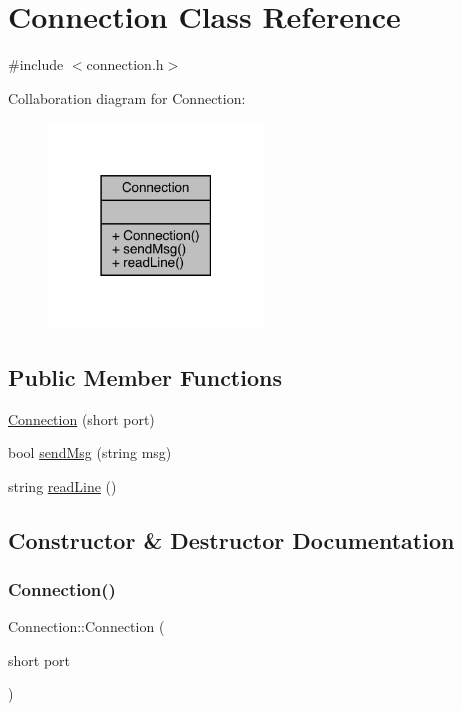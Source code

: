 \hypertarget{class_connection}{}\section{Connection Class Reference}
\label{class_connection}


{\ttfamily \#include $<$connection.\+h$>$}



Collaboration diagram for Connection\+:\nopagebreak
\begin{figure}[H]
\begin{center}
\leavevmode
\includegraphics[width=162pt]{class_connection__coll__graph}
\end{center}
\end{figure}
\subsection*{Public Member Functions}
\begin{DoxyCompactItemize}
\item 
\hyperlink{class_connection_a8089476d48ba545f44e691cd4bd0278d}{Connection} (short port)
\item 
bool \hyperlink{class_connection_a4b9f6db1fb42fc9857f829fa0bc52e6e}{send\+Msg} (string msg)
\item 
string \hyperlink{class_connection_a1df16b436751b686d96c24ca0c498659}{read\+Line} ()
\end{DoxyCompactItemize}


\subsection{Constructor \& Destructor Documentation}
\hypertarget{class_connection_a8089476d48ba545f44e691cd4bd0278d}{}\label{class_connection_a8089476d48ba545f44e691cd4bd0278d} 
\subsubsection{\texorpdfstring{Connection()}{Connection()}}
{\footnotesize\ttfamily Connection\+::\+Connection (\begin{DoxyParamCaption}\item[{short}]{port }\end{DoxyParamCaption})}



